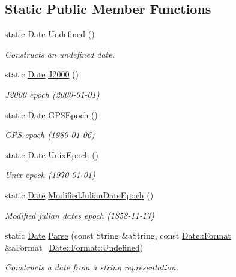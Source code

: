 \subsection*{Static Public Member Functions}
\begin{DoxyCompactItemize}
\item 
static \hyperlink{classostk_1_1physics_1_1time_1_1_date}{Date} \hyperlink{classostk_1_1physics_1_1time_1_1_date_adbffa0c4847013c5a562acccda582f4e}{Undefined} ()
\begin{DoxyCompactList}\small\item\em Constructs an undefined date. \end{DoxyCompactList}\item 
static \hyperlink{classostk_1_1physics_1_1time_1_1_date}{Date} \hyperlink{classostk_1_1physics_1_1time_1_1_date_a0291e75d2537f1df98246a811eb24811}{J2000} ()
\begin{DoxyCompactList}\small\item\em J2000 epoch (2000-\/01-\/01) \end{DoxyCompactList}\item 
static \hyperlink{classostk_1_1physics_1_1time_1_1_date}{Date} \hyperlink{classostk_1_1physics_1_1time_1_1_date_afd90b35a6ca9b2a55a69a3de34b09623}{G\+P\+S\+Epoch} ()
\begin{DoxyCompactList}\small\item\em G\+PS epoch (1980-\/01-\/06) \end{DoxyCompactList}\item 
static \hyperlink{classostk_1_1physics_1_1time_1_1_date}{Date} \hyperlink{classostk_1_1physics_1_1time_1_1_date_acc3389d494f95b539f600997d1ec7d85}{Unix\+Epoch} ()
\begin{DoxyCompactList}\small\item\em Unix epoch (1970-\/01-\/01) \end{DoxyCompactList}\item 
static \hyperlink{classostk_1_1physics_1_1time_1_1_date}{Date} \hyperlink{classostk_1_1physics_1_1time_1_1_date_a1745f88cba99bde5a17c30170b80b1b4}{Modified\+Julian\+Date\+Epoch} ()
\begin{DoxyCompactList}\small\item\em Modified julian dates epoch (1858-\/11-\/17) \end{DoxyCompactList}\item 
static \hyperlink{classostk_1_1physics_1_1time_1_1_date}{Date} \hyperlink{classostk_1_1physics_1_1time_1_1_date_a385deed9349a7b4fc20f5502c4919600}{Parse} (const String \&a\+String, const \hyperlink{classostk_1_1physics_1_1time_1_1_date_a77a2e52ee3bcfd7c93139d2fe2c9a141}{Date\+::\+Format} \&a\+Format=\hyperlink{classostk_1_1physics_1_1time_1_1_date_a77a2e52ee3bcfd7c93139d2fe2c9a141aec0fc0100c4fc1ce4eea230c3dc10360}{Date\+::\+Format\+::\+Undefined})
\begin{DoxyCompactList}\small\item\em Constructs a date from a string representation. \end{DoxyCompactList}\end{DoxyCompactItemize}
